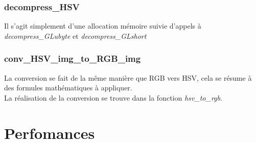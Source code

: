 \documentclass[12pt, letterpaper]{article}
\begin{document}
\subsubsection{decompress\_HSV}
Il s'agit simplement d'une allocation mémoire suivie d'appels à \\\textit{decompress\_GLubyte} et \textit{decompress\_GLshort}

\subsubsection{conv\_HSV\_img\_to\_RGB\_img}
La conversion se fait de la même manière que RGB vers HSV, cela se résume à des formules mathématiques à appliquer.\\
La réalisation de la conversion se trouve dans la fonction \textit{hsv\_to\_rgb}.

\section{Perfomances}



 
\end{document}
